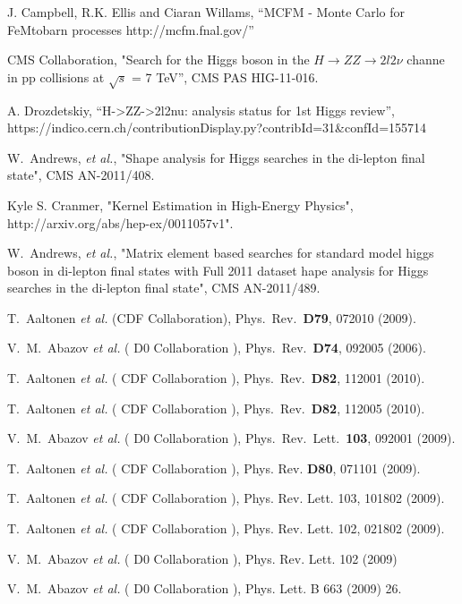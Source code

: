 J. Campbell, R.K. Ellis and Ciaran Willams, ``MCFM - Monte Carlo for FeMtobarn processes http://mcfm.fnal.gov/''

CMS Collaboration, "Search for the Higgs boson in the $H\to ZZ\to 2l2\nu$ 
channe in pp collisions at $\sqrt{s}$ = 7 TeV'', CMS PAS HIG-11-016.

A. Drozdetskiy, ``H->ZZ->2l2nu: analysis status for 1st Higgs review'', https://indico.cern.ch/contributionDisplay.py?contribId=31\&confId=155714


W.~Andrews, \textit{et al.}, "Shape analysis for Higgs searches in the di-lepton final state", CMS AN-2011/408.

Kyle S. Cranmer, "Kernel Estimation in High-Energy Physics", {http://arxiv.org/abs/hep-ex/0011057v1"}.

W.~Andrews, \textit{et al.}, "Matrix element based searches for standard model higgs boson in di-lepton final states with Full 2011 
dataset hape analysis for Higgs searches in the di-lepton final state", CMS AN-2011/489.

%
%

T.~Aaltonen {\it et al.} (CDF Collaboration),  Phys.\ Rev.\  {\bf D79}, 072010 (2009).

V.~M.~Abazov {\it et al.} ( D0 Collaboration ), Phys.\ Rev.\  {\bf D74}, 092005 (2006).

T.~Aaltonen {\it et al.} ( CDF Collaboration ), Phys.\ Rev.\  {\bf D82}, 112001 (2010).

T.~Aaltonen {\it et al.} ( CDF Collaboration ), Phys.\ Rev.\  {\bf D82}, 112005 (2010).

V.~M.~Abazov {\it et al.} ( D0 Collaboration ), Phys.\ Rev.\ Lett.\  {\bf 103}, 092001 (2009).

T.~Aaltonen {\it et al.} ( CDF Collaboration ), Phys. Rev. {\bf D80}, 071101 (2009).

T.~Aaltonen {\it et al.} ( CDF Collaboration ), Phys. Rev. Lett. 103, 101802 (2009).

T.~Aaltonen {\it et al.} ( CDF Collaboration ), Phys. Rev. Lett. 102, 021802 (2009).

V.~M.~Abazov {\it et al.} ( D0 Collaboration ), Phys. Rev. Lett. 102 (2009)

V.~M.~Abazov {\it et al.} ( D0 Collaboration ), Phys. Lett. B 663 (2009) 26.

